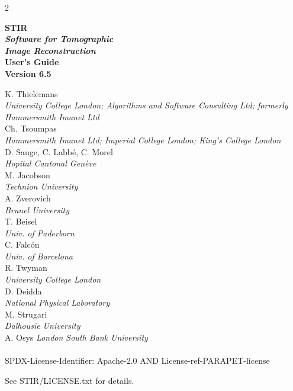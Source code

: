 \documentclass{article}
\begin{document}
\begin{spacing}{2}
\begin{center}

\textbf{
{\Huge  STIR} 
\huge
\\[1cm]
\textit{ Software for  Tomographic \\ Image Reconstruction}
}
\\[3cm]

\textbf{{\huge User's Guide\\
 Version 6.5}}
\end{center}

\end{spacing}

\large 

\noindent 
K. Thielemans \\
{\it \small University College London; Algorithms and Software Consulting Ltd; formerly Hammersmith Imanet Ltd}\\
Ch. Tsoumpas\\ 
{\it \small Hammersmith Imanet Ltd; Imperial College London; King's College London}\\
D. Sauge, C. Labb\'e, C. Morel \\
{\it \small Hopital Cantonal Gen\`eve}\\
M. Jacobson \\
{\it \small Technion University}\\
A. Zverovich \\
{\it \small Brunel University} \\
T. Beisel \\
{\it \small Univ. of Paderborn} \\
C. Falc\'{o}n \\
{\it \small Univ. of Barcelona} \\
R. Twyman \\
{\it \small University College London}\\
D. Deidda \\
{\it \small National Physical Laboratory}\\
M. Strugari \\
{\it \small Dalhousie University}\\
A. Osys
{\it \small London South Bank University}
\\
\\

SPDX-License-Identifier: Apache-2.0 AND License-ref-PARAPET-license

See STIR/LICENSE.txt for details.

\newpage
\end{document}
